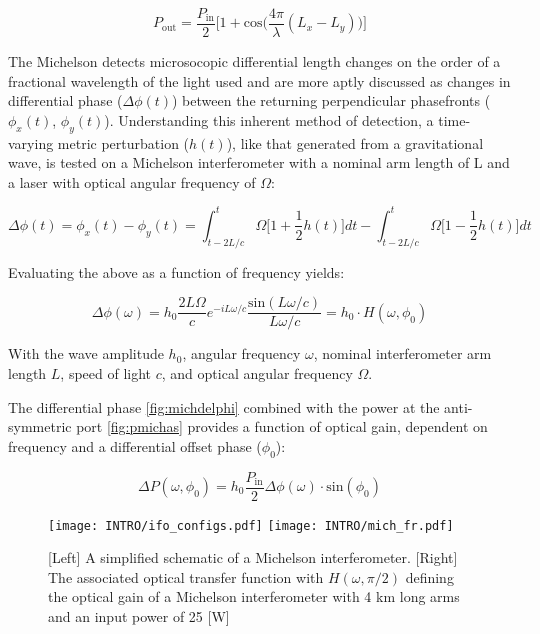 \begin{equation}\label{fig:pmichas}
	P_\mathrm{out} = \frac{P_\mathrm{in}}{2} \bigg[1+\mathrm{cos}\Big(\frac{4\pi}{\lambda} (L_x - L_y)\Big) \bigg]
\end{equation}

The Michelson detects microsocopic differential length changes on the order of a fractional wavelength of the light used and are more aptly discussed as changes in differential phase ($\Delta \phi(t)$) between the returning perpendicular phasefronts ($\phi_x(t)$, $\phi_y(t)$). Understanding this inherent method of detection, a time-varying metric perturbation ($h(t)$), like that generated from a gravitational wave, is tested on a Michelson interferometer with a nominal arm length of L and a laser with optical angular frequency of $\Omega$:

\begin{equation}
\Delta \phi(t) = \phi_x(t) - \phi_y(t) =  \int_{t-2L/c}^{t} \Omega \bigg[1 + \frac{1}{2}h(t)\bigg]dt - \int_{t-2L/c}^{t} \Omega \bigg[1 - \frac{1}{2}h(t)\bigg]dt 
\end{equation}

\noindent Evaluating the above as a function of frequency yields:

\begin{equation}\label{fig:michdelphi}
	\Delta \phi (\omega) = h_0\frac{2 L \Omega}{c}e^{-i L \omega / c} \frac{\mathrm{sin}(L \omega /c)}{L \omega /c} = h_0 \cdot H(\omega, \phi_0)
\end{equation}

With the wave amplitude $h_0$, angular frequency $\omega$, nominal interferometer arm length $L$, speed of light $c$, and optical angular frequency $\Omega$.

The differential phase \autoref{fig:michdelphi} combined with the power at the anti-symmetric port \autoref{fig:pmichas} provides a function of optical gain, dependent on frequency and a differential offset phase ($\phi_0$):

\begin{equation}
	\Delta P(\omega, \phi_0) = h_0 \frac{P_\mathrm{in}}{2} \Delta \phi (\omega) \cdot \mathrm{sin}(\phi_0)
\end{equation}

\begin{figure}[ht!]
	\begin{subcaptiongroup}
		\texttt{[image: INTRO/ifo\_configs.pdf]}
		\texttt{[image: INTRO/mich\_fr.pdf]}
 	\end{subcaptiongroup}
  	\hfill
	\caption{[Left] A simplified schematic of a Michelson interferometer. [Right] The associated optical transfer function with $H(\omega, \pi/2)$ defining the optical gain of a Michelson interferometer with 4 km long arms and an input power of 25 [W]}
		\label{fig:mich}
\end{figure}
\FloatBarrier

